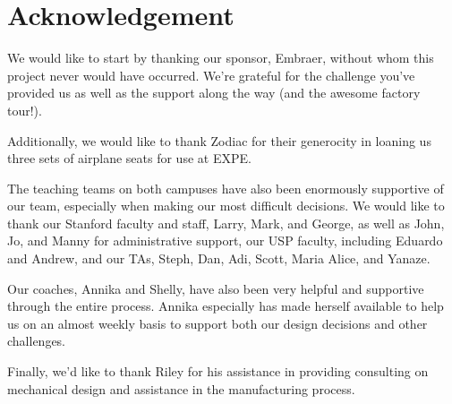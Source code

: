 \chapter{Acknowledgement}

We would like to start by thanking our sponsor, Embraer, without whom this project never would have occurred. We're grateful for the challenge you've provided us as well as the support along the way (and the awesome factory tour!).

Additionally, we would like to thank Zodiac for their generocity in loaning us three sets of airplane seats for use at EXPE.

The teaching teams on both campuses have also been enormously supportive of our team, especially when making our most difficult decisions. We would like to thank our Stanford faculty and staff, Larry, Mark, and George, as well as John, Jo, and Manny for administrative support, our USP faculty, including Eduardo and Andrew, and our TAs, Steph, Dan, Adi, Scott, Maria Alice, and Yanaze.

Our coaches, Annika and Shelly, have also been very helpful and supportive through the entire process. Annika especially has made herself available to help us on an almost weekly basis to support both our design decisions and other challenges.


Finally, we'd like to thank Riley for his assistance in providing consulting on mechanical design and assistance in the manufacturing process.

